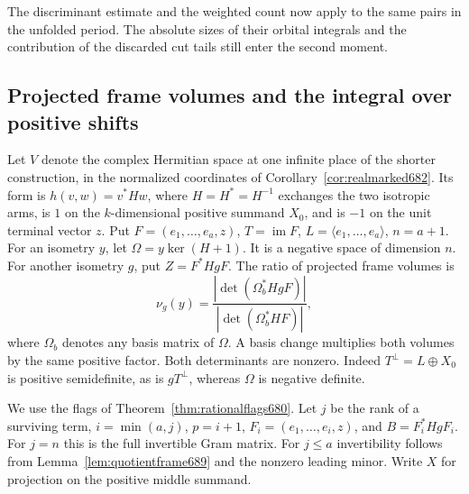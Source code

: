 \documentclass[a4paper,11pt]{article}
\theoremstyle{definition}
\theoremstyle{remark}
\numberwithin{equation}{section}
\begin{document}
The discriminant estimate and the weighted count now apply
to the same pairs in the unfolded period. The absolute sizes
of their orbital integrals and the contribution of the
discarded cut tails still enter the second moment.


\subsection{Projected frame volumes and the integral over positive shifts}
\label{sec:schurshift692}

Let \(V\) denote the complex Hermitian space at one infinite
place of the shorter construction, in the normalized coordinates of
Corollary~\ref{cor:realmarked682}. Its form is \(h(v,w)=v^*Hw\),
where \(H=H^*=H^{-1}\) exchanges the two isotropic arms, is \(1\)
on the \(k\)-dimensional positive summand \(X_0\), and is \(-1\)
on the unit terminal vector \(z\). Put \(F=(e_1,\ldots,e_a,z)\),
\(T=\operatorname{im}F\), \(L=\langle e_1,\ldots,e_a\rangle\),
\(n=a+1\). For an isometry \(y\), let \(\Omega=y\ker(H+1)\).
It is a negative space of dimension \(n\). For another isometry
\(g\), put \(Z=F^*HgF\). The ratio of projected frame volumes is
\[
            \nu_g(y)=\frac{|\det(\Omega_b^*HgF)|}
                                {|\det(\Omega_b^*HF)|},
\]
where \(\Omega_b\) denotes any basis matrix of \(\Omega\).
A basis change multiplies both volumes by the same positive factor.
Both determinants are nonzero. Indeed \(T^\perp=L\oplus X_0\)
is positive semidefinite, as is \(gT^\perp\), whereas \(\Omega\)
is negative definite.

We use the flags of Theorem~\ref{thm:rationalflags680}. Let
\(j\) be the rank of a surviving term, \(i=\min(a,j)\),
\(p=i+1\), \(F_i=(e_1,\ldots,e_i,z)\), and \(B=F_i^*HgF_i\).
For \(j=n\) this is the full invertible Gram matrix. For
\(j\le a\) invertibility follows from
Lemma~\ref{lem:quotientframe689} and the nonzero leading minor.
Write \(X\) for projection on the positive middle summand.
\end{document}
